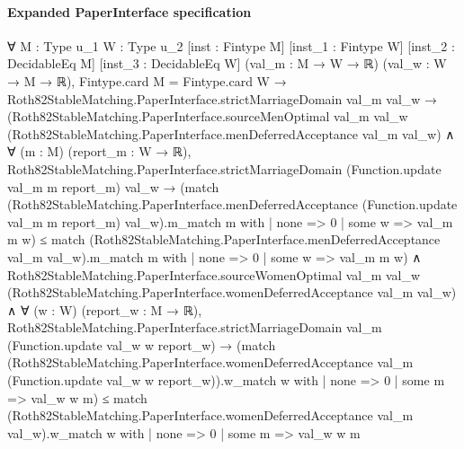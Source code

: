 \documentclass[10pt]{article}
\begin{document}
\paragraph{Expanded PaperInterface specification}
\begin{ReviewVerbatim}
∀ {M : Type u_1} {W : Type u_2} [inst : Fintype M] [inst_1 : Fintype W] [inst_2 : DecidableEq M]
  [inst_3 : DecidableEq W] (val_m : M → W → ℝ) (val_w : W → M → ℝ),
  Fintype.card M = Fintype.card W →
    Roth82StableMatching.PaperInterface.strictMarriageDomain val_m val_w →
      (Roth82StableMatching.PaperInterface.sourceMenOptimal val_m val_w
            (Roth82StableMatching.PaperInterface.menDeferredAcceptance val_m val_w) ∧
          ∀ (m : M) (report_m : W → ℝ),
            Roth82StableMatching.PaperInterface.strictMarriageDomain (Function.update val_m m report_m) val_w →
              (match
                  (Roth82StableMatching.PaperInterface.menDeferredAcceptance (Function.update val_m m report_m)
                        val_w).m_match
                    m with
                | none => 0
                | some w => val_m m w) ≤
                match (Roth82StableMatching.PaperInterface.menDeferredAcceptance val_m val_w).m_match m with
                | none => 0
                | some w => val_m m w) ∧
        Roth82StableMatching.PaperInterface.sourceWomenOptimal val_m val_w
            (Roth82StableMatching.PaperInterface.womenDeferredAcceptance val_m val_w) ∧
          ∀ (w : W) (report_w : M → ℝ),
            Roth82StableMatching.PaperInterface.strictMarriageDomain val_m (Function.update val_w w report_w) →
              (match
                  (Roth82StableMatching.PaperInterface.womenDeferredAcceptance val_m
                        (Function.update val_w w report_w)).w_match
                    w with
                | none => 0
                | some m => val_w w m) ≤
                match (Roth82StableMatching.PaperInterface.womenDeferredAcceptance val_m val_w).w_match w with
                | none => 0
                | some m => val_w w m
\end{ReviewVerbatim}
\end{document}

